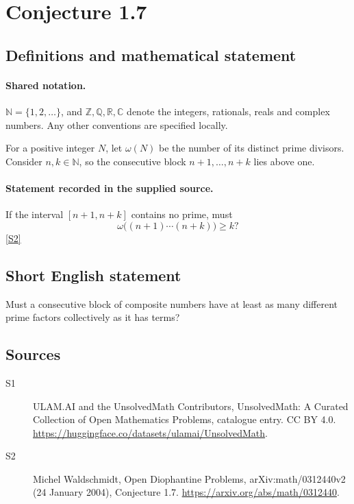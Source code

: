 \documentclass[11pt]{article}
\newcommand{\sref}[2]{\hyperlink{source:#1:#2}{[S#2]}}
\begin{document}
\section{Conjecture 1.7}\label{statement}

\subsection{Definitions and mathematical statement}

\paragraph{Shared notation.}$\mathbb N=\{1,2,\ldots\}$, and $\mathbb Z,\mathbb Q,\mathbb R,\mathbb C$ denote the integers, rationals, reals and complex numbers. Any other conventions are specified locally.


For a positive integer $N$, let $\omega(N)$ be the number of its distinct prime divisors. Consider $n,k\in\mathbb N$, so the consecutive block $n+1,\ldots,n+k$ lies above one.
\paragraph{Statement recorded in the supplied source.}
If the interval $[n+1,n+k]$ contains no prime, must \[\omega\bigl((n+1)\cdots(n+k)\bigr)\ge k?\] \sref{statement}{2}
\subsection{Short English statement}
Must a consecutive block of composite numbers have at least as many different prime factors collectively as it has terms?
\subsection{Sources}
\begin{description}
\item[\hypertarget{source:statement:1}{S1}] ULAM.AI and the UnsolvedMath Contributors, UnsolvedMath: A Curated Collection of Open Mathematics Problems, catalogue entry. CC BY 4.0. \url{https://huggingface.co/datasets/ulamai/UnsolvedMath}.
\item[\hypertarget{source:statement:2}{S2}] Michel Waldschmidt, Open Diophantine Problems, arXiv:math/0312440v2 (24 January 2004), Conjecture 1.7. \url{https://arxiv.org/abs/math/0312440}.
\end{description}
\label{end:statement}
\end{document}
